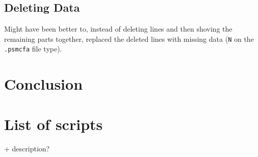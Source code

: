 \documentclass[11pt,a4paper]{article}
\begin{document}
\subsection{Deleting Data}
Might have been better to, instead of deleting lines and then shoving the remaining parts together, replaced the deleted lines with missing data (\verb|N| on the \verb|.psmcfa| file type).

\section{Conclusion}

\appendix
\section{List of scripts}
+ description?


{}
\end{document}

